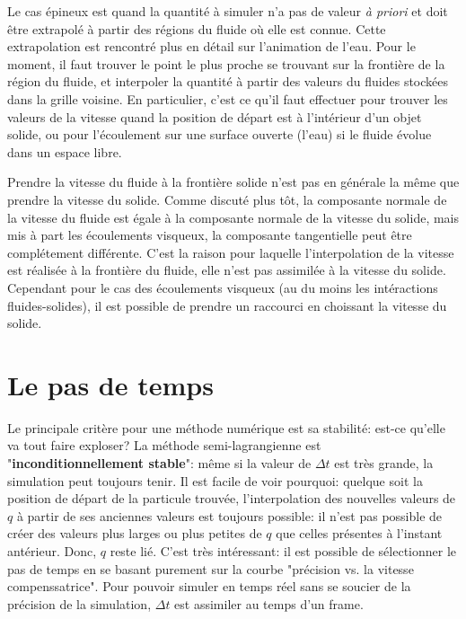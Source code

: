 \documentclass[11pt]{report}
\begin{document}
Le cas épineux est quand la quantité à simuler n'a pas de valeur \textit{à priori} et doit être extrapolé à partir des régions du fluide où elle est connue. Cette extrapolation est rencontré plus en détail sur l'animation de l'eau. Pour le moment, il faut trouver le point le plus proche se trouvant sur la frontière de la région du fluide, et interpoler la quantité à partir des valeurs du fluides stockées dans la grille voisine. En particulier, c'est ce qu'il faut effectuer pour trouver les valeurs de la vitesse quand la position de départ est à l'intérieur d'un objet solide, ou pour l'écoulement sur une surface ouverte (l'eau) si le fluide évolue dans un espace libre.\newline

Prendre la vitesse du fluide à la frontière solide n'est pas en générale la même que prendre la vitesse du solide. Comme discuté plus tôt, la composante normale de la vitesse du fluide est égale à la composante normale de la vitesse du solide, mais mis à part les écoulements visqueux, la composante tangentielle peut être complétement différente. C'est la raison pour laquelle l'interpolation de la vitesse est réalisée à la frontière du fluide, elle n'est pas assimilée à la vitesse du solide. Cependant pour le cas des écoulements visqueux (au du moins les intéractions fluides-solides), il est possible de prendre un raccourci en choissant la vitesse du solide.

\section{Le pas de temps}

Le principale critère pour une méthode numérique est sa stabilité: est-ce qu'elle va tout faire exploser? La méthode semi-lagrangienne est "\textbf{inconditionnellement stable}": même si la valeur de $\Delta t$ est très grande, la simulation peut toujours tenir. Il est facile de voir pourquoi: quelque soit la position de départ de la particule trouvée, l'interpolation des nouvelles valeurs de $q$ à partir de ses anciennes valeurs est toujours possible: il n'est pas possible de créer des valeurs plus larges ou plus petites de $q$ que celles présentes à l'instant antérieur. Donc, $q$ reste lié. C'est très intéressant: il est possible de sélectionner le pas de temps en se basant purement sur la courbe "précision vs. la vitesse compenssatrice". Pour pouvoir simuler en temps réel sans se soucier de la précision de la simulation, $\Delta t$ est assimiler au temps d'un frame.\newline
\end{document}
